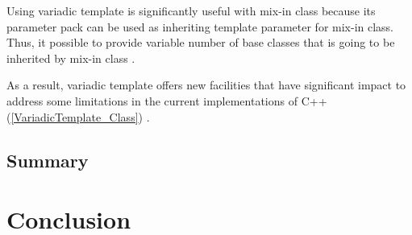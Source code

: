 \documentclass[11pt]{report}
\begin{document}
Using variadic template is significantly useful with mix-in class because its parameter pack can be used as inheriting template parameter for mix-in class. Thus, it possible to provide variable number of base classes that is going to be inherited by mix-in class \cite{Gregor:2007:VTC}.


As a result, variadic template offers new facilities that have significant impact to address some limitations in the current implementations of C++ (\ref{VariadicTemplate_Class}) \cite{Gregor:2007:VTC}.

\section{Summary}
\label{section1: Summary}

\chapter{Conclusion}
\label{sec: conclusion}


	
\end{document}
